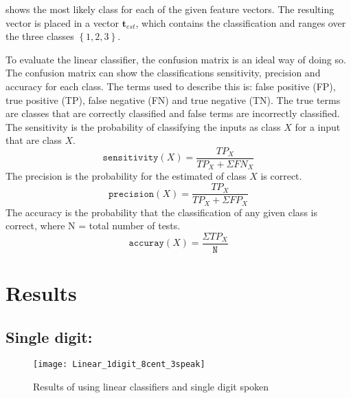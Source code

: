 shows the most likely class for each of the given feature vectors. 
The resulting vector is placed in a vector $\mathbf{t}_{est}$, which contains the classification and ranges over the three classes $\left\lbrace 1,2,3\right\rbrace $. 

To evaluate the linear classifier, the confusion matrix is an ideal way of doing so.
The confusion matrix can show the classifications sensitivity, precision and accuracy for each class. 
The terms used to describe this is: false positive (FP), true positive (TP), false negative (FN) and true negative (TN).
The true terms are classes that are correctly classified and false terms are incorrectly classified.
The sensitivity is the probability of classifying the inputs as class $X$ for a input that are class $X$.
\begin{equation}
\mathtt{sensitivity}(X) = \dfrac{TP_X}{TP_X+\Sigma FN_X}
\label{eq:sensitivity}
\end{equation}
The precision is the probability for the estimated of class $X$ is correct.
\begin{equation}
\mathtt{precision}(X) = \dfrac{TP_X}{TP_X+\Sigma FP_X}
\label{eq:precision}
\end{equation}
The accuracy is the probability that the classification of any given class is correct, where N = total number of tests.
\begin{equation}
\mathtt{accuray}(X) = \dfrac{\Sigma TP_X}{\mathtt{N}}
\label{eq:accuracy}
\end{equation}



\section{Results}
\subsection{Single digit:}

\begin{figure}[H]
\centering
\texttt{[image: Linear\_1digit\_8cent\_3speak]}
\caption{Results of using linear classifiers and single digit spoken}
\label{fig:Lin_fig_1}
\end{figure}

